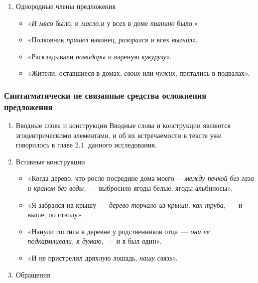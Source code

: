 \documentclass{kursa4}
\begin{document}
{\begin{enumerate}
            \item Однородные члены предложения
            \begin{itemize}
              \item «\textit{И мясо} было, и \textit{масло,}и у всех в доме \textit{пианино} было.» 
              \item «Полковник \textit{пришел} наконец, \textit{разорался} и всех \textit{выгнал}».
              \item «Раскладывали \textit{помидоры} и вареную \textit{кукурузу}».
              \item «Жители, оставшиеся в домах, \textit{своих} или \textit{чужих}, прятались в подвалах».
            \end{itemize}
          \end{enumerate}

      \subsubsection{Синтагматически не связанные средства осложнения предложения}

        \begin{enumerate}
          \item Вводные слова и конструкции \newline
          Вводные слова и конструкции являются
          эгоцентрическими элементами, и об их встречаемости в тексте уже
          говорилось в главе 2.1. данного исследования. 

          \item Вставные конструкции

          \begin{itemize}
            \item «Когда дерево, что росло посредине дома моего~---\textit{между печкой без газа и краном без воды,}~--- выбросило ягоды белые, ягоды-альбиносы».
            \item «Я забрался на крышу~--- \textit{дерево торчало из крыши, как труба,}~--- и выше, по стволу».
            \item «Нанули гостила в деревне у родственников отца~--- \textit{они ее подкармливали, я думаю,}~--- и я был один».
            \item «И не пристрелил дряхлую лошадь, \textit{нашу связь}».
          \end{itemize}

          \item Обращения


\end{enumerate}}
\end{document}
